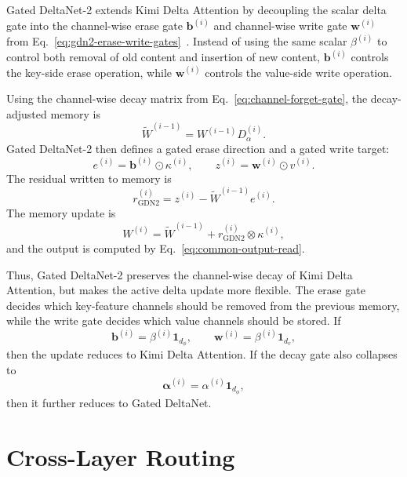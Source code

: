 \documentclass{article}
\begin{document}
Gated DeltaNet-2 extends Kimi Delta Attention by decoupling the scalar delta gate into the channel-wise erase gate $\bm b^{(i)}$ and channel-wise write gate $\bm w^{(i)}$ from Eq.~\eqref{eq:gdn2-erase-write-gates}~\cite{hatamizadeh2026gdn2}. Instead of using the same scalar $\beta^{(i)}$ to control both removal of old content and insertion of new content, $\bm b^{(i)}$ controls the key-side erase operation, while $\bm w^{(i)}$ controls the value-side write operation.

Using the channel-wise decay matrix from Eq.~\eqref{eq:channel-forget-gate}, the decay-adjusted memory is
\begin{equation}
\widetilde W^{(i-1)}
=
W^{(i-1)}
D_{\alpha}^{(i)}.
\end{equation}
Gated DeltaNet-2 then defines a gated erase direction and a gated write target:
\begin{equation}
e^{(i)}
=
\bm b^{(i)} \odot \kappa^{(i)},
\qquad
z^{(i)}
=
\bm w^{(i)} \odot v^{(i)}.
\end{equation}
The residual written to memory is
\begin{equation}
r_{\mathrm{GDN2}}^{(i)}
=
z^{(i)}
-
\widetilde W^{(i-1)} e^{(i)}.
\end{equation}
The memory update is
\begin{equation}
W^{(i)}
=
\widetilde W^{(i-1)}
+
r_{\mathrm{GDN2}}^{(i)}
\otimes
\kappa^{(i)},
\end{equation}
and the output is computed by Eq.~\eqref{eq:common-output-read}.

Thus, Gated DeltaNet-2 preserves the channel-wise decay of Kimi Delta Attention, but makes the active delta update more flexible. The erase gate decides which key-feature channels should be removed from the previous memory, while the write gate decides which value channels should be stored. If
\[
\bm b^{(i)}
=
\beta^{(i)}\mathbf{1}_{d_\phi},
\qquad
\bm w^{(i)}
=
\beta^{(i)}\mathbf{1}_{d_v},
\]
then the update reduces to Kimi Delta Attention. If the decay gate also collapses to
\[
\bm{\alpha}^{(i)}
=
\alpha^{(i)}\mathbf{1}_{d_\phi},
\]
then it further reduces to Gated DeltaNet.

\section{Cross-Layer Routing}
\label{sec:cler}
\end{document}
